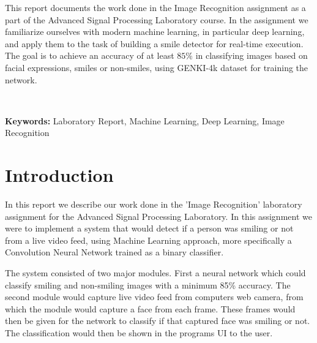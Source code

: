 \documentclass[12pt,a4paper,english
]{tunithesis}
\begin{document}
\vspace{0.5cm}


\noindent
This report documents the work done in the Image Recognition assignment as a part of the Advanced Signal Processing Laboratory course. In the assignment we familiarize ourselves with modern machine learning, in particular deep learning, and apply them to the task of building a smile detector for real-time execution. The goal is to achieve an accuracy of at least $85 \%$ in classifying images based on facial expressions, smiles or non-smiles, using GENKI-4k dataset for training the network.


~

\noindent\textbf{Keywords:} Laboratory Report, Machine Learning, Deep Learning, Image Recognition




\setcounter{tocdepth}{3}              %
\tableofcontents                      %


\if@twoside
\cleardoublepage
\fi


\renewcommand{\chaptername}{} %


\chapter{Introduction}
\label{ch:intro}
In this report we describe our work done in the 'Image Recognition' laboratory assignment for the Advanced Signal Processing Laboratory. In this assignment we were to implement a system that would detect if a person was smiling or not from a live video feed, using Machine Learning approach, more specifically a Convolution Neural Network trained as a binary classifier.

The system consisted of two major modules. First a neural network which could classify smiling and non-smiling images with a minimum 85\% accuracy. The second module would capture live video feed from computers web camera, from which the module would capture a face from each frame. These frames would then be given for the network to classify if that captured face was smiling or not. The classification would then be shown in the programs UI to the user.
\end{document}
